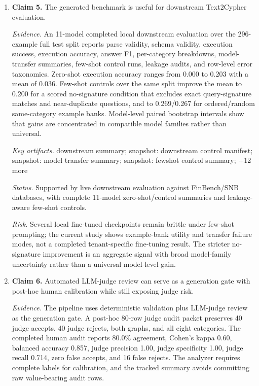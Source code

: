 \begin{enumerate}
\textit{Status.} Supported by full-export statistics and diversity diagnostics.\par
\textit{Risk.} Low query-signature diversity in the reported local-model run remains a limitation and ablation target.
\item \textbf{Claim 5.} The generated benchmark is useful for downstream Text2Cypher evaluation.\par
\textit{Evidence.} An 11-model completed local downstream evaluation over the 296-example full test split reports parse validity, schema validity, execution success, execution accuracy, answer F1, per-category breakdowns, model-transfer summaries, few-shot control runs, leakage audits, and row-level error taxonomies. Zero-shot execution accuracy ranges from 0.000 to 0.203 with a mean of 0.036. Few-shot controls over the same split improve the mean to 0.200 for a scored no-signature condition that excludes exact query-signature matches and near-duplicate questions, and to 0.269/0.267 for ordered/random same-category example banks. Model-level paired bootstrap intervals show that gains are concentrated in compatible model families rather than universal.\par
\textit{Key artifacts.} downstream summary; snapshot: downstream control manifest; snapshot: model transfer summary; snapshot: fewshot control summary; +12 more\par
\textit{Status.} Supported by live downstream evaluation against FinBench/SNB databases, with complete 11-model zero-shot/control summaries and leakage-aware few-shot controls.\par
\textit{Risk.} Several local fine-tuned checkpoints remain brittle under few-shot prompting; the current study shows example-bank utility and transfer failure modes, not a completed tenant-specific fine-tuning result. The stricter no-signature improvement is an aggregate signal with broad model-family uncertainty rather than a universal model-level gain.
\item \textbf{Claim 6.} Automated LLM-judge review can serve as a generation gate with post-hoc human calibration while still exposing judge risk.\par
\textit{Evidence.} The pipeline uses deterministic validation plus LLM-judge review as the generation gate. A post-hoc 80-row judge audit packet preserves 40 judge accepts, 40 judge rejects, both graphs, and all eight categories. The completed human audit reports 80.0\% agreement, Cohen's kappa 0.60, balanced accuracy 0.857, judge precision 1.00, judge specificity 1.00, judge recall 0.714, zero false accepts, and 16 false rejects. The analyzer requires complete labels for calibration, and the tracked summary avoids committing raw value-bearing audit rows.\par

\end{enumerate}
